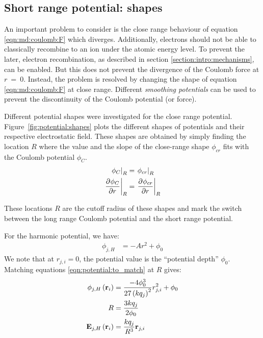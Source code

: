\subsection{Short range potential: shapes}
\label{section:intro:md:potentials}

An important problem to consider is the close range behaviour of equation
\eqref{eqn:md:coulomb:F} which diverges. Additionally, electrons should not be
able to classically recombine to an ion under the atomic energy level. To
prevent the later, electron recombination, as described in section
\ref{section:intro:mechanisms}, can be enabled. But this does not prevent
the divergence of the Coulomb force at $r~=~0$. Instead, the problem is resolved by
changing the shape of equation \eqref{eqn:md:coulomb:F} at close range.
Different \textit{smoothing potentials} can be used to prevent the
discontinuity of the Coulomb potential (or force).


Different potential shapes were investigated for the close range potential.
Figure~\ref{fig:potential:shapes} plots the different shapes of potentials and
their respective electrostatic field. These shapes are obtained by simply
finding the location $R$ where the value and the slope of the close-range shape
$\phi_{cr}$ fits with the Coulomb potential $\phi_C$.
\begin{subequations}
\begin{align}
\left. \phi_C        \right|_{R} & = \left. \phi_{cr} \right|_{R} \\
\left. \frac{\partial^{{}} \phi_C}{\partial r^{{}}} \right|_{R} & = \left. \frac{\partial^{{}} \phi_{cr}}{\partial r^{{}}} \right|_{R}
\end{align}
\label{eqn:potential:to_match}
\end{subequations}

These locations $R$ are the cutoff radius of these shapes and mark the switch
between the long range Coulomb potential and the short range potential.

For the harmonic potential, we have:
\begin{align}
\phi_{j,H} & = -A r^2 + \phi_0
\end{align}
We note that at $r_{j,i} = 0$, the potential value is the ``potential depth''
$\phi_0$.
Matching equations \eqref{eqn:potential:to_match} at $R$ gives:
\begin{subequations}
\begin{align}
\phi_{j,H}\left( \textbf{r}_i \right) & = \frac{-4 \phi_0^3}{27 \left( k q_j \right)^2} r_{j,i}^2 + \phi_0
\\
R & = \frac{3 k q_j}{2 \phi_0} \\
\textbf{E}_{j,H}\left( \textbf{r}_i \right) & = \frac{k q_j}{R^3} \textbf{r}_{j,i}
\end{align}
\end{subequations}


